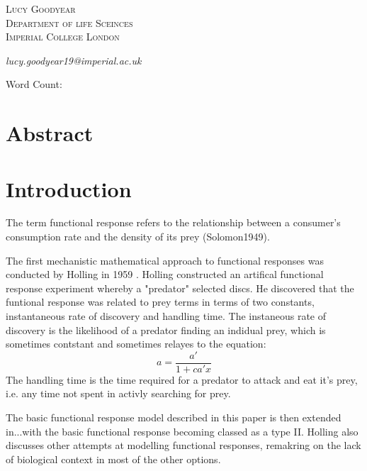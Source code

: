 \documentclass[11pt, a4paper, titlepage]{article}
\begin{document}
\begin{titlepage}
	
	
	\vspace{0.5\baselineskip} %
	
	{\scshape\Large Lucy Goodyear\\
		Department of life Sceinces \\
		Imperial College London\\} %
	
	\textit{lucy.goodyear19@imperial.ac.uk}
	\date{}
	
	\vspace*{3\baselineskip} %
	
	Word Count:
	
\end{titlepage}
	
\section*{Abstract}

\newpage

\section{Introduction}

The term functional response refers to the relationship between a consumer's consumption rate and the density of its prey (Solomon1949). 

The first mechanistic mathematical approach to functional responses was conducted by Holling in 1959 \parencite{Holling1959b}. Holling constructed an artifical functional response experiment whereby a "predator" selected discs. He discovered that the funtional response was related to prey terms in terms of two constants, instantaneous rate of discovery and handling time. The instaneous rate of discovery is the likelihood of a predator finding an indidual prey, which is sometimes contstant and sometimes relayes to the equation:
\begin{equation}
a = \frac{a'}{1 + ca'x}
\end{equation}
The handling time is the time required for a predator to attack and eat it's prey, i.e. any time not spent in activly searching for prey.

The basic functional response model described in this paper is then extended in...with the basic functional response becoming classed as a type II.
Holling also discusses other attempts at modelling functional responses, remakring on the lack of biological context in most of the other options.
\end{document}
